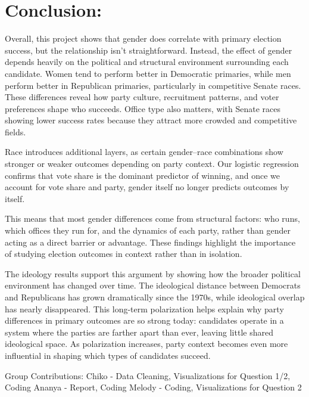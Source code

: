 \documentclass[
]{article}
\begin{document}
\section{Conclusion:}\label{conclusion}

Overall, this project shows that gender does correlate with primary
election success, but the relationship isn't straightforward. Instead,
the effect of gender depends heavily on the political and structural
environment surrounding each candidate. Women tend to perform better in
Democratic primaries, while men perform better in Republican primaries,
particularly in competitive Senate races. These differences reveal how
party culture, recruitment patterns, and voter preferences shape who
succeeds. Office type also matters, with Senate races showing lower
success rates because they attract more crowded and competitive fields.

Race introduces additional layers, as certain gender--race combinations
show stronger or weaker outcomes depending on party context. Our
logistic regression confirms that vote share is the dominant predictor
of winning, and once we account for vote share and party, gender itself
no longer predicts outcomes by itself.

This means that most gender differences come from structural factors:
who runs, which offices they run for, and the dynamics of each party,
rather than gender acting as a direct barrier or advantage. These
findings highlight the importance of studying election outcomes in
context rather than in isolation.

The ideology results support this argument by showing how the broader
political environment has changed over time. The ideological distance
between Democrats and Republicans has grown dramatically since the
1970s, while ideological overlap has nearly disappeared. This long-term
polarization helps explain why party differences in primary outcomes are
so strong today: candidates operate in a system where the parties are
farther apart than ever, leaving little shared ideological space. As
polarization increases, party context becomes even more influential in
shaping which types of candidates succeed.

Group Contributions: Chiko - Data Cleaning, Visualizations for Question
1/2, Coding Ananya - Report, Coding Melody - Coding, Visualizations for
Question 2
\end{document}
